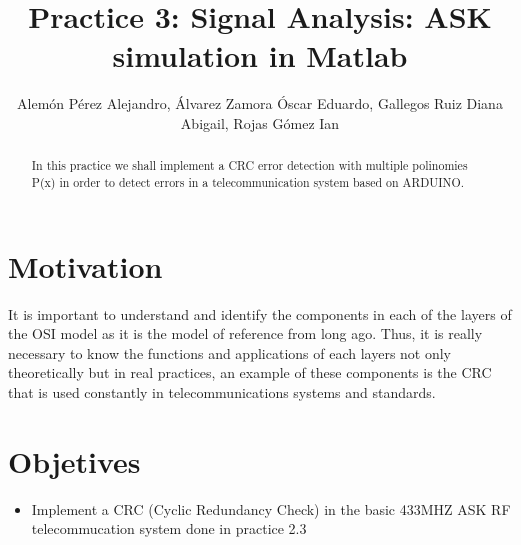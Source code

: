 \documentclass{IEEEtran}
\title{Practice 3: Signal Analysis: ASK simulation in Matlab}
\author{Alemón Pérez Alejandro, Álvarez Zamora Óscar Eduardo, Gallegos Ruiz Diana Abigail, Rojas Gómez Ian }
\begin{document}
	
	\maketitle
	\begin{abstract}
	In this practice we shall implement a CRC error detection with multiple polinomies P(x) in order to detect errors in a telecommunication system based on ARDUINO.
	\end{abstract}
	\section{Motivation}	
		It is important to understand and identify the components in each of the layers of the OSI model as it is the model of reference from long ago. Thus, it is really necessary to know the functions and applications of each layers not only theoretically but in real practices, an example of these components is the CRC that is used constantly in telecommunications systems and standards.
	
	\section{Objetives}
		\begin{itemize}
			
			\item 	Implement a CRC (Cyclic Redundancy Check) in the basic 433MHZ ASK RF telecommucation system done in practice 2.3
			
		\end{itemize}

	
	
	
	
\end{document}
